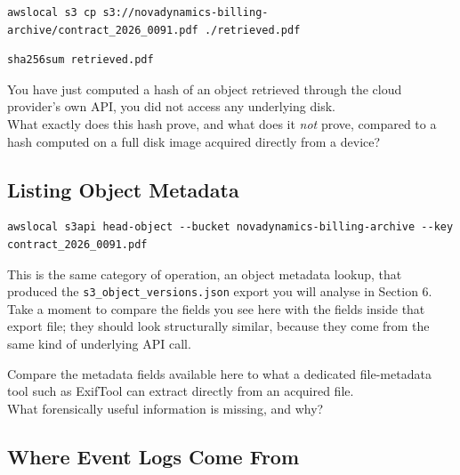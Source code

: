 \begin{lstlisting}
awslocal s3 cp s3://novadynamics-billing-archive/contract_2026_0091.pdf ./retrieved.pdf
\end{lstlisting}
\begin{lstlisting}
sha256sum retrieved.pdf
\end{lstlisting}

\begin{questionbox}
You have just computed a hash of an object retrieved through the cloud provider's own API, you did not access any underlying disk. \\
What exactly does this hash prove, and what does it \emph{not} prove, compared to a hash computed on a full disk image acquired directly from a device?
\end{questionbox}

\begin{answerbox}
\vspace{2.5cm}
\end{answerbox}

\subsection{Listing Object Metadata}

\begin{lstlisting}
awslocal s3api head-object --bucket novadynamics-billing-archive --key contract_2026_0091.pdf
\end{lstlisting}
This is the same category of operation, an object metadata lookup, that produced the
\texttt{s3\_object\_versions.json} export you will analyse in Section 6. \\Take a moment to compare
the fields you see here with the fields inside that export file; they should look structurally
similar, because they come from the same kind of underlying API call.

\begin{questionbox}
Compare the metadata fields available here to what a dedicated file-metadata tool such as ExifTool can extract directly from an acquired file. \\
What forensically useful information is missing, and why?
\end{questionbox}

\begin{answerbox}
\vspace{2.5cm}
\end{answerbox}

\subsection{Where Event Logs Come From}

